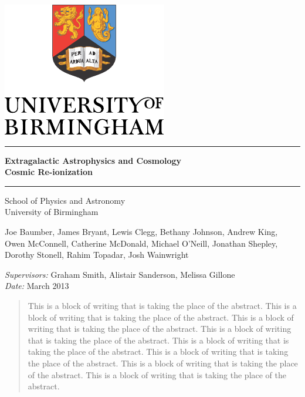 \begin{titlepage}
  \begin{center}
    \vspace*{\fill}

    \centering
    \includegraphics[scale=1.0]{Logo.pdf}
    \vfill

    \hrule
    {\LARGE\bf Extragalactic Astrophysics and Cosmology\\Cosmic Re-ionization \\[0.4cm]}
    \hrule

    \vfill
    \large
    School of Physics and Astronomy\\
    University of Birmingham

    \vfill
    { Joe Baumber, 
    	James Bryant, 
    	Lewis Clegg, 
    	Bethany Johnson, 
    	Andrew King, 
    	Owen McConnell, 
    	Catherine McDonald, 
    	Michael O'Neill, 
    	Jonathan Shepley, 
    	Dorothy Stonell, 
    	Rahim Topadar, 
    	Josh Wainwright\\}
    \vfill

    \vfill
    \textit{Supervisors:} Graham Smith, Alistair Sanderson, Melissa Gillone \\
    		\vfill
    \textit{Date:} March 2013
    \vfill

    \begin{abstract}
    	This is a block of writing that is taking the place of the abstract. This is a block of writing that is taking the place of the abstract. This is a block of writing that is taking the place of the abstract. This is a block of writing that is taking the place of the abstract. This is a block of writing that is taking the place of the abstract. This is a block of writing that is taking the place of the abstract. This is a block of writing that is taking the place of the abstract. This is a block of writing that is taking the place of the abstract.
    \end{abstract}  	
   
    
    \vfill

  \end{center}
\end{titlepage}


